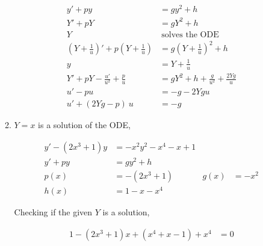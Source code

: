\begin{enumerate}
\begin{enumerate}
                    \begin{align}
                        y' + py           & = gy^{2} + h                          \\
                        Y' +pY            & = gY^{2} + h                          \\
                        Y                 & \ \text{solves the ODE}               \\
                        \left( Y + \frac{1}{u} \right)' + p\left( Y
                        + \frac{1}{u} \right)
                                          & = g\left( Y + \frac{1}{u} \right)^{2}
                        + h                                                       \\
                        y                 & = Y + \frac{1}{u}                     \\
                        Y' + pY -\frac{u'}{u^{2}} + \frac{p}{u}
                                          & = gY^{2} + h + \frac{g}{u^{2}}
                        + \frac{2Yg}{u}                                           \\
                        u' - pu           & = -g - 2Ygu                           \\
                        u' + (2Yg - p)\ u & = -g
                    \end{align}


              \item $ Y = x $ is a solution of the ODE,

                    \begin{align}
                        y' - (2x^{3} + 1)y & = -x^{2}y^{2}-x^{4} -x +1   \\
                        y' + py            & = gy^{2} + h                \\
                        p(x)               & = -(2x^{3} + 1)           &
                        g(x)               & = -x^{2}                    \\
                        h(x)               & = 1 - x - x^{4}
                    \end{align}

                    Checking if the given $ Y $ is a solution,

                    \begin{align}
                        1 - (2x^{3} + 1)x + (x^{4} + x -1) + x^{4} & = 0
                    \end{align}


\end{enumerate}
\end{enumerate}
